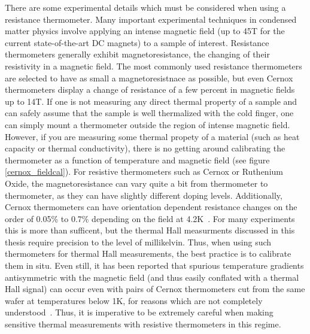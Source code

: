 \documentclass{thesis-umich}
\begin{document}
There are some experimental details which must be considered when using a
resistance thermometer. Many important experimental techniques in condensed
matter physics involve applying an intense magnetic field (up to 45T for the
current state-of-the-art DC magnets) to a sample of interest. Resistance
thermometers generally exhibit magnetoresistance, the changing of their
resistivity in a magnetic field. The most commonly used resistance thermometers
are selected to have as small a magnetoresistnace as possible, but even Cernox
thermometers display a change of resistance of a few percent in magnetic fields
up to 14T. If one is not measuring any direct thermal property of a sample and
can safely assume that the sample is well thermalized with the cold finger, one
can simply mount a thermometer outside the region of intense magnetic field.
However, if you are measuring some thermal propety of a material (such as heat
capacity or thermal conductivity), there is no getting around calibrating the
thermometer as a function of temperature and magnetic field (see figure
\ref{cernox_fieldcal}). For resistive thermometers such as Cernox or Ruthenium
Oxide, the magnetoresistance can vary quite a bit from thermometer to
thermometer, as they can have slightly different doping levels. Additionally,
Cernox thermometers can have orientation dependent resistance changes on the
order of 0.05\% to 0.7\% depending on the field at 4.2K~\cite{Brandt1999}. For
many experiments this is more than sufficent, but the thermal Hall measurments
discussed in this thesis require precision to the level of millikelvin. Thus,
when using such thermometers for thermal Hall measurements, the best practice
is to calibrate them in situ. Even still, it has been reported that spurious
temperature gradients antisymmetric with the magnetic field (and thus easily
conflated with a thermal Hall signal) can occur even with pairs of Cernox
thermometers cut from the same wafer at temperatures below 1K, for reasons
which are not completely understood~\cite{HirschbergerThesis}. Thus, it is
imperative to be extremely careful when making sensitive thermal measurements
with resistive thermometers in this regime.
\end{document}
